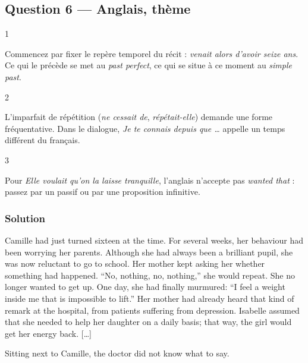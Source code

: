 \documentclass[11pt,a4paper]{article}
\begin{document}
\hypertarget{question-6-anglais-thuxe8me}{%
\subsection{Question 6 --- Anglais, thème}\label{question-6-anglais-thuxe8me}}

\begin{indication}{1}

Commencez par fixer le repère temporel du récit : \emph{venait alors d'avoir seize ans}. Ce qui le précède se met au \emph{past perfect}, ce qui se situe à ce moment au \emph{simple past}.

\end{indication}

\begin{indication}{2}

L'imparfait de répétition (\emph{ne cessait de}, \emph{répétait-elle}) demande une forme fréquentative. Dans le dialogue, \emph{Je te connais depuis que \ldots{}} appelle un temps différent du français.

\end{indication}

\begin{indication}{3}

Pour \emph{Elle voulait qu'on la laisse tranquille}, l'anglais n'accepte pas \emph{wanted that} : passez par un passif ou par une proposition infinitive.

\end{indication}

\hypertarget{solution-5}{%
\subsubsection{Solution}\label{solution-5}}

Camille had just turned sixteen at the time. For several weeks, her behaviour had been worrying her parents. Although she had always been a brilliant pupil, she was now reluctant to go to school. Her mother kept asking her whether something had happened. ``No, nothing, no, nothing,'' she would repeat. She no longer wanted to get up. One day, she had finally murmured: ``I feel a weight inside me that is impossible to lift.'' Her mother had already heard that kind of remark at the hospital, from patients suffering from depression. Isabelle assumed that she needed to help her daughter on a daily basis; that way, the girl would get her energy back. {[}\ldots{]}

Sitting next to Camille, the doctor did not know what to say.
\end{document}
